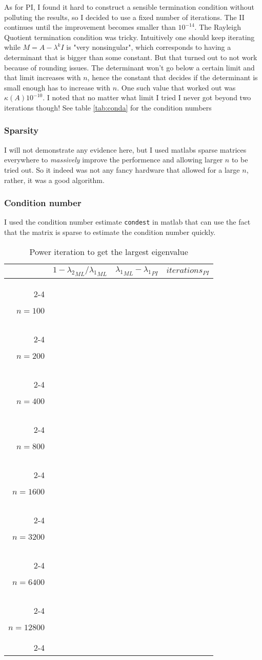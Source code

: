 \documentclass[a4paper,11pt]{article}
\begin{document}
As for PI, I found it hard to construct a sensible termination condition
without polluting the results, so I decided to use a fixed number of
iterations. The II continues until the improvement becomes smaller than
$10^{-14}$. The Rayleigh Quotient termination condition was tricky.
Intuitively one should keep iterating while $M=A-\lambda^{k}I$ is "very
nonsingular", which corresponds to having a determinant that is bigger
than some constant. But that turned out to not work because of rounding
issues. The determinant won't go below a certain limit and that limit
increases with $n$, hence the constant that decides if the determinant
is small enough has to increase with $n$. One such value that worked out
was $\kappa(A)10^{-10}$. I noted that no matter what limit I tried I
never got beyond two iterations though! See table \ref{tab:conda} for
the condition numbers

\subsubsection{Sparsity}

I will not demonstrate any evidence here, but I used matlabs sparse
matrices everywhere to \emph{massively} improve the performence and
allowing larger $n$ to be tried out. So it indeed was not any fancy
hardware that allowed for a large $n$, rather, it was a good algorithm.

\subsubsection{Condition number}

I used the condition number estimate \texttt{condest} in matlab that can
use the fact that the matrix is sparse to estimate the condition number
quickly.

\newcommand{\fornTwo}[1] {
  #1{100}
  #1{200}
}

\newcommand{\fornSix}[1] {
  \fornTwo{#1}
  #1{400}
  #1{800}
  #1{1600}
  #1{3200}
}

\newcommand{\fornEight}[1] {
  \fornSix{#1}
  #1{6400}
  #1{12800}
}

\newcommand{\fornTen}[1] {
  \fornEight{#1}
  #1{25600}
  #1{51200}
}

\newcommand{\pimacro}[1] {
  \ensuremath{n=#1} & 
                    & 
                    & 
                    \\ \cline{2-4}
}
\begin{table}[h]
  \centering
  \begin{tabular}{r|c|c|c|}
    \multicolumn{1}{r}{}
     & \multicolumn{1}{c}{$1-{\lambda_2}_{ML}/{\lambda_1}_{ML}$}
     & \multicolumn{1}{c}{${\lambda_1}_{ML}-{\lambda_1}_{PI}$}
     & \multicolumn{1}{c}{$iterations_{PI}$}\\
    \cline{2-4}
    \fornEight{\pimacro}
  \end{tabular}
  \caption{Power iteration to get the largest eigenvalue}
  \label{tab:powerit}
\end{table}
\end{document}
